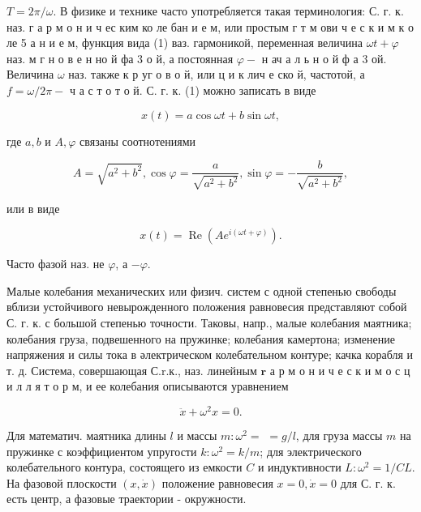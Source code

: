 \documentclass[10pt]{article}
\begin{document}
$T=2 \pi / \omega$. В физике и технике часто употребляется такая терминология: С. г. к. наз. г а р м о н и ч ес ким ко ле бан и е м, или простым г т м ови ч е с к и м к о ле 5 а н и е м, функция вида (1) ваз. гармоникой, переменная величина $\omega t+\varphi$ наз. м г н о в е н но й фа 3 о й, а постоянная $\varphi-$ н ач а л ь н о й ф а 3 ой. Величина $\omega$ наз. также к р уг о в о й, или ц и к лич е ско й, частотой, а $f=\omega / 2 \pi-$ ч а с т о т о й. С. г. к. (1) можно записать в виде



\[

x(t)=a \cos \omega t+b \sin \omega t,

\]



где $a, b$ и $A, \varphi$ связаны соотнотениями



\[

A=\sqrt{a^{2}+b^{2}}, \cos \varphi=\frac{a}{\sqrt{a^{2}+b^{2}}}, \sin \varphi=-\frac{b}{\sqrt{a^{2}+b^{2}}},

\]



или в виде



\[

x(t)=\operatorname{Re}\left(A e^{i(\omega t+\varphi)}\right) .

\]



Часто фазой наз. не $\varphi$, а $-\varphi$.



Малые колебания механических или физич. систем с одной степенью свободы вблизи устойчивого невырожденного положения равновесия представляют собой С. г. к. с большой степенью точности. Таковы, напр., малые колебания маятника; колебания груза, подвешенного на пружинке; колебания камертона; изменение напряжения и силы тока в әлектрическом колебательном контуре; качка корабля и т. д. Система, совершающая С.r.к., наз. линейным $\boldsymbol{r}$ а р м о н и ч е с к и м о с ц и л л я т о р м, и ее колебания описываются уравнением



\[

\ddot{x}+\omega^{2} x=0 .

\]



Для математич. маятника длины $l$ и массы $m: \omega^{2}=$ $=g / l$, для груза массы $m$ на пружинке с коэффициентом упругости $k: \omega^{2}=k / m$; для электрического колебательного контура, состоящего из емкости $C$ и индуктивности $L: \omega^{2}=1 / C L$. На фазовой плоскости $(x, \dot{x})$ положение равновесия $x=0, \dot{x}=0$ для С. г. к. есть центр, а фазовые траектории - окружности.
\end{document}
